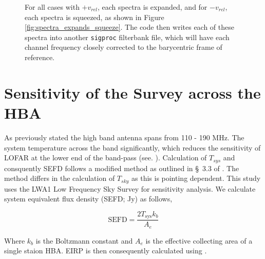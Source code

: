 \begin{figure}[h]
{For all cases with $+v_{rel}$, each spectra is expanded, and for $-v_{rel}$, each spectra is squeezed, as shown in Figure \ref{fig:spectra_expands_squeeze}. 
The code then writes each of these spectra into another \texttt{sigproc}  filterbank file, which will have each channel frequency closely corrected to the barycentric frame of reference.}  
\label{fig:code_outline}
\end{figure}


\section{Sensitivity of the Survey across the HBA}
\label{SEC2:A2}
As previously stated the high band antenna spans from 110 - 190 MHz. The system temperature across the band significantly, which reduces the sensitivity of LOFAR at the lower end of the band-pass (see. ). Calculation of $T_{sys}$ and consquently SEFD follows a modified method as outlined in \S~3.3 of \cite{David-RRAT}. The method differs in the calculation of $T_{sky}$ as this is pointing dependent. This study uses the LWA1 Low Frequency Sky Survey \citep{LWA-survey} for sensitivity analysis. We calculate system equivalent flux density (SEFD; Jy) as follows, 

\begin{equation}
    \text{SEFD} = \frac{2 T_{\text{sys}} k_b}{A_e}
\end{equation}

Where $k_b$ is the Boltzmann constant and $A_e$ is the effective collecting area of a single staion HBA. EIRP is then consequently calculated using .


